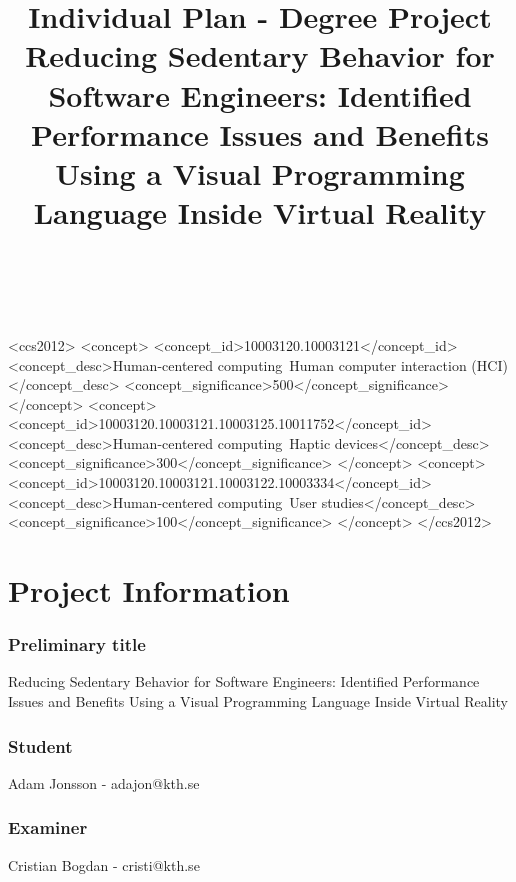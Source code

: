 \documentclass{sigchi}
\def\plaintitle{Individual Plan - Degree Project}
\def\subplaintitle{
  Reducing Sedentary Behavior for Software Engineers: Identified Performance Issues and Benefits Using a Visual Programming Language Inside Virtual Reality
}
\begin{document}
\title{%
  \plaintitle \\
  \large \subplaintitle
}

\author{
  \\
}

\maketitle



\begin{CCSXML}
<ccs2012>
<concept>
<concept_id>10003120.10003121</concept_id>
<concept_desc>Human-centered computing~Human computer interaction (HCI)</concept_desc>
<concept_significance>500</concept_significance>
</concept>
<concept>
<concept_id>10003120.10003121.10003125.10011752</concept_id>
<concept_desc>Human-centered computing~Haptic devices</concept_desc>
<concept_significance>300</concept_significance>
</concept>
<concept>
<concept_id>10003120.10003121.10003122.10003334</concept_id>
<concept_desc>Human-centered computing~User studies</concept_desc>
<concept_significance>100</concept_significance>
</concept>
</ccs2012>
\end{CCSXML}


\section{Project Information}

\subsubsection{Preliminary title} 
\subplaintitle

\subsubsection{Student} 
Adam Jonsson - adajon@kth.se

\subsubsection{Examiner} 
Cristian Bogdan - cristi@kth.se
\end{document}
